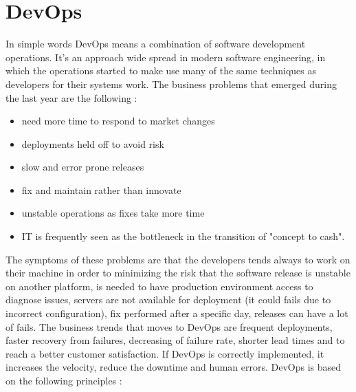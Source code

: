 \section{DevOps}
In simple words DevOps means a combination of software development operations. It's an approach wide spread in modern software engineering, in which the operations started to make use many of the same techniques as developers for their systems work. The business problems that emerged during the last year are the following :
\begin{itemize}
    \item need more time to respond to market changes
    \item deployments held off to avoid risk
    \item slow and error prone releases
    \item fix and maintain rather than innovate
    \item unstable operations as fixes take more time
    \item IT is frequently seen as the bottleneck in the transition of "concept to cash".
\end{itemize}
The symptoms of these problems are that the developers tends always to work on their machine in order to minimizing the risk that the software release is unstable on another platform, is needed to have production environment access to diagnose issues, servers are not available for deployment (it could fails due to incorrect configuration), fix performed after a specific day, releases can have a lot of fails. The business trends that moves to DevOps are frequent deployments, faster recovery from failures, decreasing of failure rate, shorter lead times and to reach a better customer satisfaction. If DevOps is correctly implemented, it increases the velocity, reduce the downtime and human errors. DevOps is based on the following principles :
